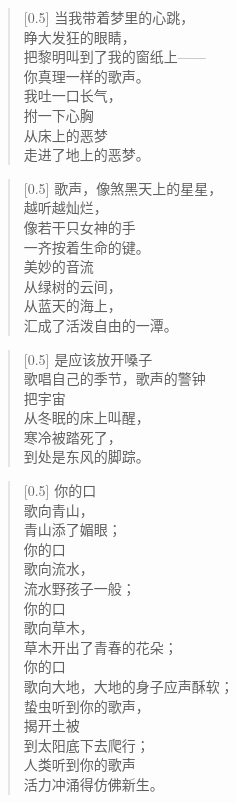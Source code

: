 \documentclass[12pt,UTF-8,openany]{ctexbook}
\begin{document}
\begin{normalsize}
    
    \begin{verse}[0.5\linewidth]
        当我带着梦里的心跳， \\
        睁大发狂的眼睛， \\
        把黎明叫到了我的窗纸上—— \\
        你真理一样的歌声。 \\
        我吐一口长气， \\
        拊一下心胸 \\
        从床上的恶梦 \\
        走进了地上的恶梦。
    \end{verse}
    
    
    \begin{verse}[0.5\linewidth]
        歌声，像煞黑天上的星星， \\
        越听越灿烂， \\
        像若干只女神的手 \\
        一齐按着生命的键。 \\
        美妙的音流 \\
        从绿树的云间， \\
        从蓝天的海上， \\
        汇成了活泼自由的一潭。
    \end{verse}
    
    
    \begin{verse}[0.5\linewidth]
        是应该放开嗓子 \\
        歌唱自己的季节，歌声的警钟 \\
        把宇宙 \\
        从冬眠的床上叫醒， \\
        寒冷被踏死了， \\
        到处是东风的脚踪。
    \end{verse}
    
    
    \begin{verse}[0.5\linewidth]
        你的口 \\
        歌向青山， \\
        青山添了媚眼； \\
        你的口 \\
        歌向流水， \\
        流水野孩子一般； \\
        你的口 \\
        歌向草木， \\
        草木开出了青春的花朵； \\
        你的口 \\
        歌向大地，大地的身子应声酥软； \\
        蛰虫听到你的歌声， \\
        揭开土被 \\
        到太阳底下去爬行； \\
        人类听到你的歌声 \\
        活力冲涌得仿佛新生。
    \end{verse}
    

\end{normalsize}
\end{document}
